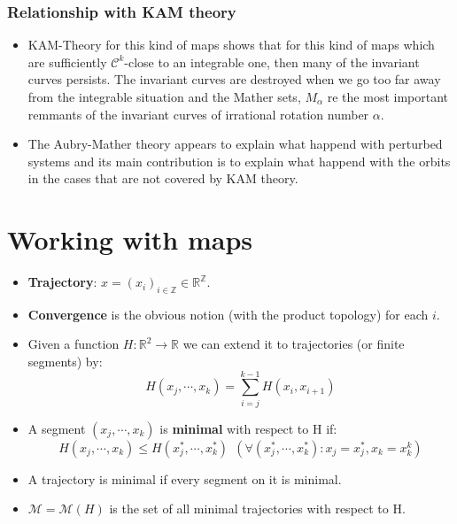 \documentclass[12 pt]{beamer}
\begin{document}
\begin{frame}{3}
    \frametitle{Relationship with KAM theory}
   	\begin{itemize}
   		\item KAM-Theory for this kind of maps shows that for this kind of maps which are sufficiently $\mathcal{C}^{k}$-close to an integrable one, then many of the invariant curves persists. The invariant curves are destroyed when we go too far away from the integrable situation and the Mather sets, $M_{\alpha}$ re the most important remmants of the invariant curves of irrational rotation number $\alpha$.
   		\item The Aubry-Mather theory appears to explain what happend with perturbed systems and its main contribution is to explain what happend with the orbits in the cases that are not covered by KAM theory.
   	\end{itemize}
\end{frame}


\section{Working with maps}

\begin{frame}{4}
	\begin{itemize}
		\item \textbf{Trajectory}: $x = (x_{i})_{i \in \mathbb{Z}} \in \mathbb{R}^{\mathbb{Z}}$.
		\item \textbf{Convergence} is the obvious notion (with the product topology) for each $i$.
		\item Given a function $H:\mathbb{R}^{2} \rightarrow \mathbb{R}$ we can extend it to trajectories (or finite segments) by:
			$$
				H(x_j, \cdots, x_k) = \sum_{i = j}^{k - 1} H(x_{i}, x_{i + 1})
			$$
	\end{itemize}
\end{frame}

\begin{frame}{5}
	\begin{itemize}
		\item A segment $(x_j, \cdots, x_k)$ is \textbf{minimal} with respect to H if:
			$$
				H(x_j, \cdots, x_k) \leq H(x_{j}^{*}, \cdots, x_{k}^{*}) \ \ (\forall (x_{j}^{*}, \cdots, x_{k}^{*}) : x_j = x_{j}^{*}, x_k = x_{k}^{k} )
			$$
		\item A trajectory is minimal if every segment on it is minimal.
		\item $\mathcal{M} = \mathcal{M} (H)$ is the set of all minimal trajectories with respect to H.
	\end{itemize}
\end{frame}
\end{document}
